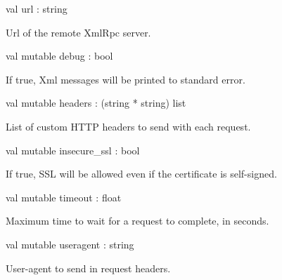 \documentclass[11pt]{article}
\begin{document}
\begin{ocamldocobjectend}


\label{val:XmlRpc.client.url}\begin{ocamldoccode}
val url : string
\end{ocamldoccode}
\begin{ocamldocdescription}
Url of the remote XmlRpc server.


\end{ocamldocdescription}


\label{val:XmlRpc.client.debug}\begin{ocamldoccode}
val mutable debug : bool
\end{ocamldoccode}
\begin{ocamldocdescription}
If true, Xml messages will be printed to standard error.


\end{ocamldocdescription}


\label{val:XmlRpc.client.headers}\begin{ocamldoccode}
val mutable headers : (string * string) list
\end{ocamldoccode}
\begin{ocamldocdescription}
List of custom HTTP headers to send with each request.


\end{ocamldocdescription}


\label{val:XmlRpc.client.insecure-underscoressl}\begin{ocamldoccode}
val mutable insecure_ssl : bool
\end{ocamldoccode}
\begin{ocamldocdescription}
If true, SSL will be allowed even if the certificate is self-signed.


\end{ocamldocdescription}


\label{val:XmlRpc.client.timeout}\begin{ocamldoccode}
val mutable timeout : float
\end{ocamldoccode}
\begin{ocamldocdescription}
Maximum time to wait for a request to complete, in seconds.


\end{ocamldocdescription}


\label{val:XmlRpc.client.useragent}\begin{ocamldoccode}
val mutable useragent : string
\end{ocamldoccode}
\begin{ocamldocdescription}
User-agent to send in request headers.



\end{ocamldocdescription}
\end{ocamldocobjectend}
\end{document}
